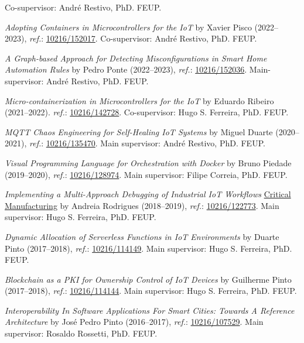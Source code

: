 \documentclass[10pt, a4paper]{article}
\newcommand{\feup}{FEUP}
\let\oldhref\href
\renewcommand{\href}[2]{\oldhref{#1}{{\small #2}}}
\begin{document}
\begin{etaremune}
	Co-supervisor: André Restivo, PhD. \feup.
	\item \textit{Adopting Containers in Microcontrollers for the IoT} by Xavier Pisco (2022--2023), \textit{ref.}: \href{https://hdl.handle.net/10216/152017}{10216/152017}.
	Co-supervisor: André Restivo, PhD. \feup.
	\item \textit{A Graph-based Approach for Detecting Misconfigurations in Smart Home Automation Rules} by Pedro Ponte (2022--2023), \textit{ref.}: \href{https://hdl.handle.net/10216/152036}{10216/152036}.
	Main-supervisor: André Restivo, PhD. \feup.
	\item \textit{Micro-containerization in Microcontrollers for the IoT} by Eduardo Ribeiro (2021--2022). \textit{ref.}: \href{http://hdl.handle.net/10216/142728}{10216/142728}.
	Co-supervisor: Hugo S. Ferreira, PhD. \feup.
	\item \textit{MQTT Chaos Engineering for Self-Healing IoT Systems} by Miguel Duarte (2020--2021), \textit{ref.}: \href{https://hdl.handle.net/10216/135470}{10216/135470}. Main supervisor: André Restivo, PhD. \feup.
	\item \textit{Visual Programming Language for Orchestration with Docker} by Bruno Piedade (2019--2020), \textit{ref.}: \href{http://hdl.handle.net/10216/128974}{10216/128974}. Main supervisor: Filipe Correia, PhD. \feup.
	\item \textit{Implementing a Multi-Approach Debugging of Industrial IoT Workflows} \href{https://www.criticalmanufacturing.com/}{Critical Manufacturing} by Andreia Rodrigues (2018--2019), \textit{ref.}: \href{http://hdl.handle.net/10216/122773}{10216/122773}. Main supervisor: Hugo S. Ferreira, PhD. \feup.
	\item \textit{Dynamic Allocation of Serverless Functions in IoT Environments} by Duarte Pinto (2017--2018), \textit{ref.}: \href{http://hdl.handle.net/10216/114149}{10216/114149}. Main supervisor: Hugo S. Ferreira, PhD. \feup.
	\item \textit{Blockchain as a PKI for Ownership Control of IoT Devices} by Guilherme Pinto (2017--2018), \textit{ref.}: \href{http://hdl.handle.net/10216/114144}{10216/114144}. Main supervisor: Hugo S. Ferreira, PhD. \feup.
	\item \textit{Interoperability In Software Applications For Smart Cities: Towards A Reference Architecture} by José Pedro Pinto (2016--2017), \textit{ref.}:  \href{http://hdl.handle.net/10216/107529}{10216/107529}. Main supervisor: Rosaldo Rossetti, PhD. \feup.
\end{etaremune}
\end{document}
